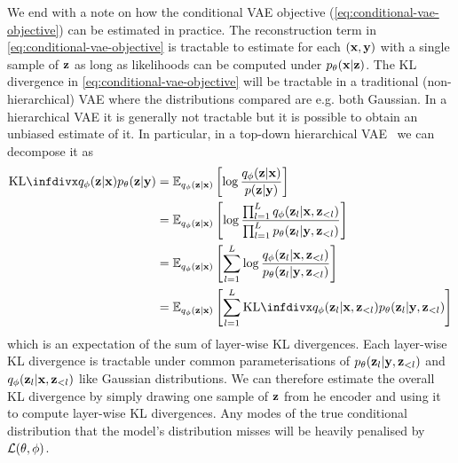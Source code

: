We end with a note on how the conditional VAE objective (\cref{eq:conditional-vae-objective}) can be estimated in practice. The reconstruction term in \cref{eq:conditional-vae-objective} is tractable to estimate for each $({\mathbf{x}},{\mathbf{y}})$ with a single sample of ${\mathbf{z}}$ as long as likelihoods can be computed under $p_\theta({\mathbf{x}}|{\mathbf{z}})$. The KL divergence in \cref{eq:conditional-vae-objective} will be tractable in  a traditional (non-hierarchical) VAE where the distributions compared are e.g. both Gaussian. In a hierarchical VAE it is generally not tractable but it is possible to obtain an unbiased estimate of it. In particular, in a top-down hierarchical VAE~\citep{vahdat2020nvae,child2020very} we can decompose it as
\begin{align}
    \kl{q_\phi(\rvz|\rvx)}{p_\theta(\rvz|\rvy)} &= \EX_{q_\phi(\rvz|\rvx)} \left[  \log \frac{q_\phi(\rvz|\rvx)}{p(\rvz|\rvy)} \right] \\
    &= \EX_{q_\phi(\rvz|\rvx)} \left[ \log \frac{\prod_{l=1}^L q_\phi(\rvz_l|\rvx,\rvz_{<l})}{\prod_{l=1}^L p_\theta(\rvz_l|\rvy,\rvz_{<l})} \right] \\
    &= \EX_{q_\phi(\rvz|\rvx)} \left[ \sum_{l=1}^L \log \frac{q_\phi(\rvz_l|\rvx,\rvz_{<l})}{p_\theta(\rvz_l|\rvy,\rvz_{<l})} \right] \\
    &= \EX_{q_\phi(\rvz|\rvx)} \left[ \sum_{l=1}^L \kl{q_\phi(\rvz_l|\rvx,\rvz_{<l})}{p_\theta(\rvz_l|\rvy,\rvz_{<l})} \right]
\end{align}
which is an expectation of the sum of layer-wise KL divergences. Each layer-wise KL divergence is tractable under common parameterisations of $p_\theta({\mathbf{z}}_l|{\mathbf{y}},{\mathbf{z}}_{<l})$ and $q_\phi({\mathbf{z}}_l|{\mathbf{x}},{\mathbf{z}}_{<l})$ like Gaussian distributions. We can therefore estimate the overall KL divergence by simply drawing one sample of ${\mathbf{z}}$ from he encoder and using it to compute layer-wise KL divergences. Any modes of the true conditional distribution that the model's distribution misses will be heavily penalised by ${\mathcal{L}}(\theta,\phi)$. 

